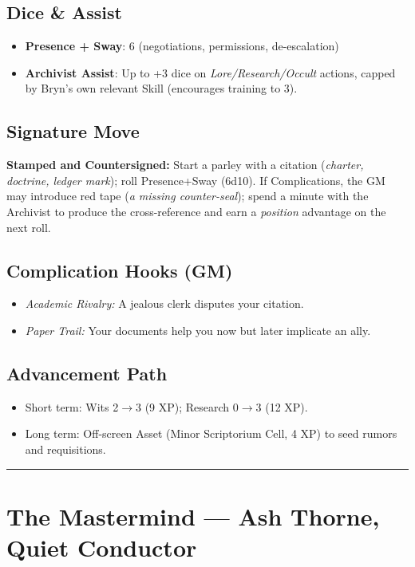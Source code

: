 \documentclass[12pt]{article}
\begin{document}
\subsection*{Dice \& Assist}
\begin{itemize}
  \item \textbf{Presence + Sway}: 6 (negotiations, permissions, de-escalation)
  \item \textbf{Archivist Assist}: Up to +3 dice on \emph{Lore/Research/Occult} actions, capped by Bryn’s own relevant Skill (encourages training to 3).
\end{itemize}

\subsection*{Signature Move}
\textbf{Stamped and Countersigned:} Start a parley with a citation (\emph{charter, doctrine, ledger mark}); roll Presence+Sway (6d10). If Complications, the GM may introduce red tape (\emph{a missing counter-seal}); spend a minute with the Archivist to produce the cross-reference and earn a \emph{position} advantage on the next roll.

\subsection*{Complication Hooks (GM)}
\begin{itemize}
  \item \emph{Academic Rivalry:} A jealous clerk disputes your citation.
  \item \emph{Paper Trail:} Your documents help you now but later implicate an ally.
\end{itemize}

\subsection*{Advancement Path}
\begin{itemize}
  \item Short term: Wits 2$\rightarrow$3 (9 XP); Research 0$\rightarrow$3 (12 XP).
  \item Long term: Off-screen Asset (Minor Scriptorium Cell, 4 XP) to seed rumors and requisitions.
\end{itemize}

\bigskip
\hrule
\bigskip

\section{The Mastermind — Ash Thorne, Quiet Conductor}
\end{document}

